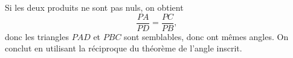 {\begin{enumerate}
{Si les deux produits ne sont pas nuls, on obtient 
\[\frac{PA}{PD} = \frac{PC}{PB},
\]
donc les triangles $PAD$ et $PBC$ sont semblables, donc ont mêmes angles. On conclut en utilisant la réciproque du théorème de l'angle inscrit.}
\end{enumerate}
}

